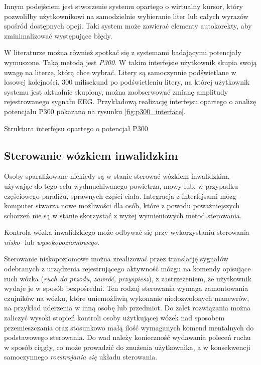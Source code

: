 \documentclass[skorowidz,skroty]{dyplomWEZUT}
\begin{document}
Innym podejściem jest stworzenie systemu opartego o wirtualny kursor, który pozwoliłby użytkownikowi na samodzielnie wybieranie liter lub całych wyrazów spośród dostępnych opcji. Taki system może zawierać elementy autokorekty, aby zminimalizować występujące błędy.

W literaturze można również spotkać się z systemami badającymi potencjały wymuszone. Taką metodą jest \textit{P300}. W takim interfejsie użytkownik skupia swoją uwagę na literze, którą chce wybrać. Litery są samoczynnie podświetlane w losowej kolejności. 300 milisekund po podświetleniu litery, na której użytkownik systemu jest aktualnie skupiony, można zaobserwować zmianę amplitudy rejestrowanego sygnału EEG\cite{bci_introduction}. Przykładową realizację interfejsu opartego o analizę potencjału P300 pokazano na rysunku \vref{fig:p300_interface}.

{Struktura interfejsu opartego o potencjał P300\label{fig:p300_interface}}
{\cite{p300_interface}}



\subsection{Sterowanie wózkiem inwalidzkim}
Osoby sparaliżowane niekiedy są w stanie sterować wózkiem inwalidzkim, używając do tego celu wydmuchiwanego powietrza, mowy lub, w przypadku częściowego paraliżu, sprawnych części ciała. Integracja z interfejsami mózg--komputer stwarza nowe możliwości dla osób, które z powodu poważniejszych schorzeń nie są w stanie skorzystać z wyżej wymieniowych metod sterowania.

Kontrola wózka inwalidzkiego może odbywać się przy wykorzystaniu sterowania \textit{nisko-} lub \textit{wysokopoziomowego}.

Sterowanie niskopoziomowe można zrealizować przez translację sygnałów odebranych z urządzenia rejestrującego aktywność mózgu na komendy opisujące ruch wózka (\textit{ruch do przodu}, \textit{zawróć}, \textit{przyspiesz}), z zastrzeżeniem, że użytkownik wydaje je w sposób bezpośredni. Ten rodzaj sterowania wymaga zamontowania czujników na wózku, które uniemożliwią wykonanie niedozwolonych manewrów, na przykład uderzenia w inną osobę lub przedmiot. Do zalet rozwiązania można zaliczyć wysoki stopień kontroli osoby użytkującej wózek nad sposobem przemieszczania oraz stosunkowo małą ilość wymaganych komend mentalnych do podstawowego sterowania. Do wad należy konieczność wydawania poleceń ruchu w sposób ciągły, co może prowadzić do znużenia użytkownika, a w konsekwencji samoczynnego \textit{rozstrajania się} układu sterowania.
\end{document}
